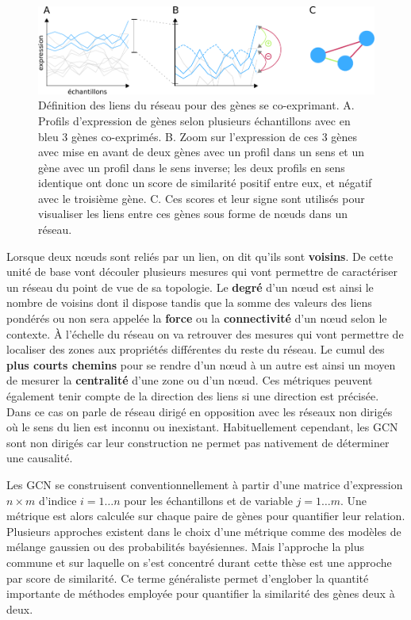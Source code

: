 \begin{figure}[h!]
    \centering
    \includegraphics[width=\textwidth]{img/intro/3_coexpr/intro_3_coexpr_expr_group_sign.pdf}
    \caption[Définition des liens du réseau pour des gènes se co-exprimant.]{Définition des liens du réseau pour des gènes se co-exprimant. A. Profils d'expression de gènes selon plusieurs échantillons avec en bleu 3 gènes co-exprimés. B. Zoom sur l'expression de ces 3 gènes avec mise en avant de deux gènes avec un profil dans un sens et un gène avec un profil dans le sens inverse; les deux profils en sens identique ont donc un score de similarité positif entre eux, et négatif avec le troisième gène. C. Ces scores et leur signe sont utilisés pour visualiser les liens entre ces gènes sous forme de nœuds dans un réseau.}
    \label{fig:coexpr_corr_weight_sign}
\end{figure}

Lorsque deux nœuds sont reliés par un lien, on dit qu'ils sont \textbf{voisins}. De cette unité de base vont découler plusieurs mesures qui vont permettre de caractériser un réseau du point de vue de sa topologie. Le \textbf{degré} d'un nœud est ainsi le nombre de voisins dont il dispose tandis que la somme des valeurs des liens pondérés ou non sera appelée la \textbf{force} ou la \textbf{connectivité} d'un nœud selon le contexte. À l'échelle du réseau on va retrouver des mesures qui vont permettre de localiser des zones aux propriétés différentes du reste du réseau. Le cumul des \textbf{plus courts chemins} pour se rendre d'un nœud à un autre est ainsi un moyen de mesurer la \textbf{centralité} d'une zone ou d'un nœud. Ces métriques peuvent également tenir compte de la direction des liens si une direction est précisée. Dans ce cas on parle de réseau dirigé en opposition avec les réseaux non dirigés où le sens du lien est inconnu ou inexistant. Habituellement cependant, les \acrshort{GCN} sont non dirigés car leur construction ne permet pas nativement de déterminer une causalité. 

Les \acrshort{GCN} se construisent conventionnellement à partir d'une matrice d'expression $n \times m$ d'indice $i = 1 \dots n$ pour les échantillons et de variable $j = 1 \dots m$. Une métrique est alors calculée sur chaque paire de gènes pour quantifier leur relation. Plusieurs approches existent dans le choix d'une métrique comme des modèles de mélange gaussien ou des probabilités bayésiennes. Mais l'approche la plus commune et sur laquelle on s'est concentré durant cette thèse est une approche par score de similarité. Ce terme généraliste permet d'englober la quantité importante de méthodes employée pour quantifier la similarité des gènes deux à deux. 



